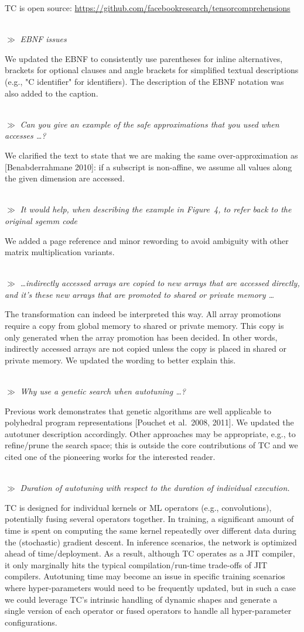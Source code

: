 \documentclass[letterpaper,11pt]{article}
\newcommand{\rev}[1]{~\\[0.5cm]{\tiny $\gg$} {\it #1}}
\newcommand{\cont}{\textlangle{}\dots\textrangle{}}
\begin{document}
TC is open source:
\url{https://github.com/facebookresearch/tensorcomprehensions}

\rev{EBNF issues}

We updated the EBNF to consistently use parentheses for inline alternatives,
brackets for optional clauses and angle brackets for simplified textual
descriptions (e.g., "C identifier" for identifiers).  The description of the
EBNF notation was also added to the caption.

\rev{Can you give an example of the safe approximations that you used when accesses
\cont ?}

We clarified the text to state that we are making the same over-approximation
as [Benabderrahmane 2010]: if a subscript is non-affine, we assume all values along the given dimension are accessed.

\rev{It would help, when describing the example in Figure~4, to refer back to the original sgemm code}

We added a page reference and minor rewording to avoid ambiguity with other matrix multiplication variants.

\rev{\cont indirectly accessed arrays are copied to new arrays that are accessed
directly, and it's these new arrays that are promoted to shared or private
memory \cont}

The transformation can indeed be interpreted this way.  All array promotions
require a copy from global memory to shared or private memory.  This copy is
only generated when the array promotion has been decided.  In other words,
indirectly accessed arrays are not copied unless the copy is placed in shared or
private memory.  We updated the wording to better explain this.

\rev{Why use a genetic search when autotuning \cont ?}

Previous work demonstrates that genetic algorithms are well applicable
to polyhedral program representations [Pouchet et al.\ 2008, 2011].
We updated the autotuner description accordingly.  Other approaches
may be appropriate, e.g., to refine/prune the search space; this is
outside the core contributions of TC and we cited one of the
pioneering works for the interested reader.

\rev{Duration of autotuning with respect to the duration of individual
execution.}

TC is designed for individual kernels or ML operators (e.g.,
convolutions), potentially fusing several operators together.  In
training, a significant amount of time is spent on computing the same
kernel repeatedly over different data during the (stochastic) gradient
descent.  In inference scenarios, the network is optimized ahead of
time/deployment. As a result, although TC operates as a JIT compiler,
it only marginally hits the typical compilation/run-time trade-offs of
JIT compilers. Autotuning time may become an issue in specific
training scenarios where hyper-parameters would need to be frequently
updated, but in such a case we could leverage TC's intrinsic handling
of dynamic shapes and generate a single version of each operator or
fused operators to handle all hyper-parameter configurations.
\end{document}
